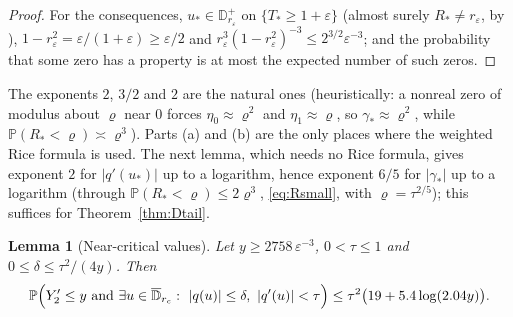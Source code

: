 \documentclass[11pt]{amsart}
\newtheorem{lemma}[theorem]{Lemma}
\theoremstyle{definition}
\theoremstyle{remark}
\numberwithin{equation}{section}
\newcommand{\D}{\mathbb{D}}
\newcommand{\PP}{\mathbb{P}}
\newcommand{\eps}{\varepsilon}
\begin{document}
\begin{proof}
For the consequences, $u_*\in\D^+_{r_\eps}$ on $\{T_*\ge1+\eps\}$ (almost surely $R_*\ne r_\eps$, by \cite[Lemma~\ref{M-lem:circle}(a)]{Main}), $1-r_\eps^2=\eps/(1+\eps)\ge\eps/2$ and $r_\eps^3(1-r_\eps^2)^{-3}\le2^{3/2}\eps^{-3}$; and the probability that some zero has a property is at most the expected number of such zeros.
\end{proof}

The exponents $2$, $3/2$ and $2$ are the natural ones (heuristically: a nonreal zero of modulus about $\varrho$ near $0$ forces $\eta_0\approx\varrho^2$ and $\eta_1\approx\varrho$, so $\gamma_*\approx\varrho^2$, while $\PP(R_*<\varrho)\asymp\varrho^3$). Parts (a) and (b) are the only places where the weighted Rice formula is used. The next lemma, which needs no Rice formula, gives exponent $2$ for $|q'(u_*)|$ up to a logarithm, hence exponent $6/5$ for $|\gamma_*|$ up to a logarithm (through $\PP(R_*<\varrho)\le2\varrho^3$, \eqref{eq:Rsmall}, with $\varrho=\tau^{2/5}$); this suffices for Theorem~\ref{thm:Dtail}.

\begin{lemma}[Near-critical values]\label{lem:nearcritical}
Let $y\ge2758\,\eps^{-3}$, $0<\tau\le1$ and $0\le\delta\le\tau^2/(4y)$. Then
\[
\PP\Bigl(Y_2'\le y\ \text{and}\ \exists u\in\overline{\D}_{r_c}:\ |q(u)|\le\delta,\ |q'(u)|<\tau\Bigr)\le\tau^2\bigl(19+5.4\log(2.04y)\bigr).
\]
\end{lemma}
\end{document}
